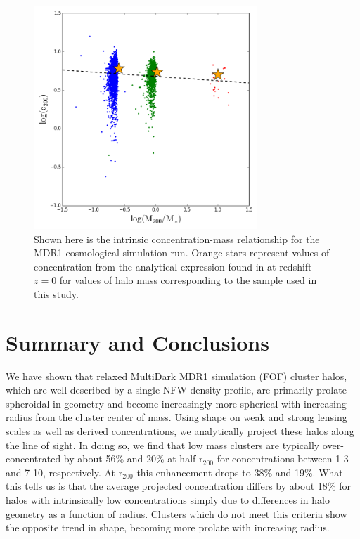 \begin{figure}
\centering
\includegraphics[width=0.75\textwidth]{images/ClusterProjectionProject/cM_slope.pdf}
\caption[The Intrinsic MDR1 c-M Relation]{Shown here is the intrinsic concentration-mass relationship for the MDR1 cosmological simulation run. Orange stars represent values of concentration from the analytical expression found in \citet{PradaEtAl2012} at redshift $z=0$ for values of halo mass corresponding to the sample used in this study.}
\end{figure}

\section{Summary and Conclusions}

We have shown that relaxed MultiDark MDR1 simulation (FOF) cluster
halos, which are well described by a single NFW density profile, are
primarily prolate spheroidal in geometry and become increasingly more spherical with
increasing radius from the cluster center of mass. Using shape on weak
and strong lensing scales as well as derived concentrations,
we analytically project these halos along the line of sight. In doing
so, we find that low mass clusters are typically over-concentrated by
about 56\% and 20\% at half $\mathrm{r_{200}}$ for concentrations  between
1-3 and 7-10, respectively. At $\mathrm{r_{200}}$ this enhancement drops to
38\% and 19\%. What this tells us is that the average projected
concentration differs by about 18\% for halos with intrinsically low
concentrations simply due to differences in halo geometry as a 
function of radius. Clusters which do not meet this criteria show the
opposite trend in shape, becoming more prolate with increasing radius. 

